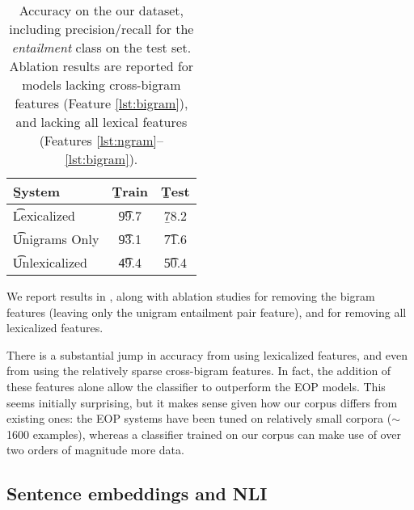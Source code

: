 %
%

\begin{table}
\begin{center}
\begin{tabular}{l@{\hskip \colspaceL}c@{\hskip \colspaceL}c}
\toprule
\b{System} & \b{Train} & \b{Test} \\
\midrule
\t{Lexicalized}            & \t{99.7}  & \b{78.2} \\ %
\t{Unigrams Only}          & \t{93.1} & \t{71.6} \\ %
\t{Unlexicalized}          & \t{49.4} & \t{50.4} \\ %
\bottomrule
\end{tabular}
\end{center}
\caption{
\label{tab:bowresults}
Accuracy on the our dataset, including precision/recall for the
  \textit{entailment} class on the test set.
Ablation results are reported for models lacking cross-bigram features 
  (Feature \ref{lst:bigram}), and lacking all lexical
  features (Features \ref{lst:ngram}--\ref{lst:bigram}).
}
\end{table}
%
%


We report results in , along with ablation studies for removing
  the bigram features (leaving only the unigram entailment pair feature),
  and for removing all lexicalized features.

There is a substantial jump in accuracy from using
  lexicalized features, and even from using the relatively sparse
  cross-bigram features.
In fact, the addition of these features alone allow the classifier to
  outperform the EOP models.
  This seems initially surprising, but it makes sense given how our corpus differs from existing ones:
  the EOP systems have been tuned on relatively small corpora
  ($\sim$1600 examples), whereas a classifier trained on our corpus can make use of
  over two orders of magnitude more data.

\subsection{Sentence embeddings and NLI}\label{sentence-embedding}

